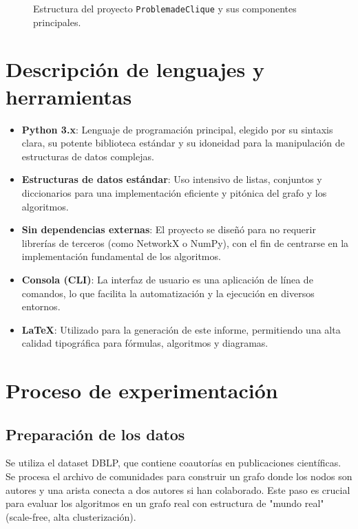 \documentclass[12pt,a4paper]{report}
\begin{document}
\begin{figure}[H]
    \caption{Estructura del proyecto \texttt{ProblemadeClique} y sus componentes principales.}
    \label{fig:project_structure}
\end{figure}

\section{Descripción de lenguajes y herramientas}
\begin{itemize}
    \item \textbf{Python 3.x}: Lenguaje de programación principal, elegido por su sintaxis clara, su potente biblioteca estándar y su idoneidad para la manipulación de estructuras de datos complejas.
    \item \textbf{Estructuras de datos estándar}: Uso intensivo de listas, conjuntos y diccionarios para una implementación eficiente y pitónica del grafo y los algoritmos.
    \item \textbf{Sin dependencias externas}: El proyecto se diseñó para no requerir librerías de terceros (como NetworkX o NumPy), con el fin de centrarse en la implementación fundamental de los algoritmos.
    \item \textbf{Consola (CLI)}: La interfaz de usuario es una aplicación de línea de comandos, lo que facilita la automatización y la ejecución en diversos entornos.
    \item \textbf{LaTeX}: Utilizado para la generación de este informe, permitiendo una alta calidad tipográfica para fórmulas, algoritmos y diagramas.
\end{itemize}

\section{Proceso de experimentación}
\subsection{Preparación de los datos}
Se utiliza el dataset DBLP, que contiene coautorías en publicaciones científicas. Se procesa el archivo de comunidades para construir un grafo donde los nodos son autores y una arista conecta a dos autores si han colaborado. Este paso es crucial para evaluar los algoritmos en un grafo real con estructura de "mundo real" (scale-free, alta clusterización).
\end{document}
